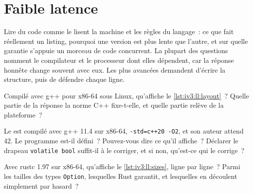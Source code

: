 \chapter{Faible latence}\label{ch:iv3:low-latency}

\begin{ivtrains}
Lire du code comme le lisent la machine et les règles du langage~: ce que fait réellement un listing, pourquoi une version est plus lente que l'autre, et sur quelle garantie
s'appuie un morceau de code concurrent. La plupart des questions nomment le compilateur et le processeur dont elles dépendent, car la réponse honnête change souvent avec eux. Les
plus avancées demandent d'écrire la structure, puis de défendre chaque ligne.
\end{ivtrains}

\begin{question}\label{iq:iv3:low-latency:1}
Compilé avec g++ pour x86-64 sous Linux, qu'affiche le \cref{lst:iv3:ll:layout}~? Quelle partie de la réponse la norme C++ fixe-t-elle, et quelle partie relève de la plateforme~?
\label{lst:iv3:ll:layout}
\end{question}

\begin{question}\label{iq:iv3:low-latency:2}
Le  est compilé avec g++ 11.4 sur x86-64, \texttt{-std=c++20 -O2}, et son auteur attend 42. Le programme est-il défini~? Pouvez-vous dire ce qu'il affiche~? Déclarer le drapeau \texttt{volatile bool} suffit-il à le corriger, et si non, qu'est-ce qui le corrige~?
\label{lst:iv3:ll:spinflag}
\end{question}

\begin{question}\label{iq:iv3:low-latency:3}
Avec rustc 1.97 sur x86-64, qu'affiche le \cref{lst:iv3:ll:sizes}, ligne par ligne~? Parmi les tailles des types \texttt{Option}, lesquelles Rust garantit, et lesquelles en découlent simplement par hasard~?
\label{lst:iv3:ll:sizes}
\end{question}

